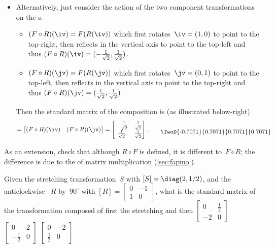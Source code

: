 \begin{example}
\begin{solution}
\begin{itemize}
\item Alternatively, just consider the action of the two component transformations on the s.
\begin{itemize}
\item \((F\circ R)(\iv)=F(R(\iv))\) which first rotates~\(\iv=(1,0)\) to point to the top-right, then reflects in the vertical axis to point to the top-left and thus \((F\circ R)(\iv)=(-\rt,\rt)\).
\item \((F\circ R)(\jv)=F(R(\jv))\) which first rotates~\(\jv=(0,1)\) to point to the top-left, then reflects in the vertical axis to point to the top-right and thus \((F\circ R)(\jv)=(\rt,\rt)\).
\end{itemize}

Then the standard matrix of the composition is (as illustrated below-right)
\begin{equation*}
[F\circ R]=\begin{bmatrix}(F\circ R)(\iv)&(F\circ R)(\jv)  \end{bmatrix}
=\begin{bmatrix} -\rt&\rt\\\rt&\rt \end{bmatrix}.
\qquad 
\raisebox{-0.5\height}{\TwoD{-0.7071}{0.7071}{0.7071}{0.7071}}
\end{equation*}

\end{itemize}
\reParshape
\end{solution}

As an extension, check that although \(R\circ F\) is defined, it is 
different to~\(F\circ R\); the difference is due to the  of matrix multiplication (\cref{sec:fapmo}).
\end{example}



\begin{activity}
Given the stretching transformation~\(S\) with  \([S]=\diag(2,1/2)\), and the anticlockwise ~\(R\) by~\(90^\circ\) with  \([R]=\begin{bmatrix} 0&-1\\1&0 \end{bmatrix}\), what is the standard matrix of the transformation composed of first the stretching and then 
{\(\begin{bmatrix} 0&\tfrac12\\-2&0 \end{bmatrix}\)}
{\(\begin{bmatrix} 0&2\\-\tfrac12&0 \end{bmatrix}\)}
{\(\begin{bmatrix} 0&-2\\\tfrac12&0 \end{bmatrix}\)}
\end{activity}




